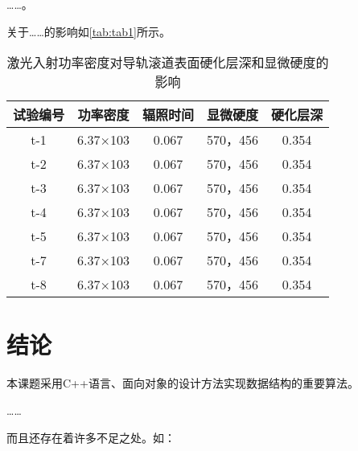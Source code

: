 \documentclass{upcthesis}
\begin{document}
……。

关于……的影响如\autoref{tab:tab1}所示。

\begin{table}[htbp]
	\centering
	\caption{激光入射功率密度对导轨滚道表面硬化层深和显微硬度的影响}
	\begin{tabular}{ccccc}
		\toprule
		试验编号 	& 功率密度 & 辐照时间 & 显微硬度 	& 硬化层深 \\ \midrule
		t-1			&	6.37×103&	0.067	&	570，456	& 	0.354\\
		t-2			&	6.37×103&	0.067 &	570，456 &	0.354\\
		t-3			&	6.37×103&	0.067 &	570，456 &	0.354\\
		t-4			&	6.37×103&	0.067 &	570，456 &	0.354\\
		t-5			&	6.37×103&	0.067 &	570，456 &	0.354\\
		t-7			&	6.37×103&	0.067 &	570，456 &	0.354\\
		t-8			&	6.37×103&	0.067 &	570，456 &	0.354\\ \bottomrule
	\end{tabular}
	\label{tab:tab1}
\end{table} 

\section{结论}
	本课题采用C++语言、面向对象的设计方法实现数据结构的重要算法。
	
	……

	而且还存在着许多不足之处。如：

	
\end{document}
